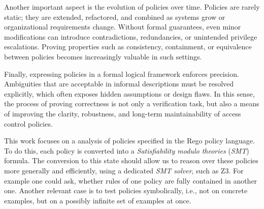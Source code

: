 Another important aspect is the evolution of policies over time.
Policies are rarely static; they are extended, refactored, and combined as systems grow or organizational requirements change.
Without formal guarantees, even minor modifications can introduce contradictions, redundancies, or unintended privilege escalations.
Proving properties such as consistency, containment, or equivalence between policies becomes increasingly valuable in such settings.

Finally, expressing policies in a formal logical framework enforces precision.
Ambiguities that are acceptable in informal descriptions must be resolved explicitly, which often exposes hidden assumptions or design flaws.
In this sense, the process of proving correctness is not only a verification task, but also a means of improving the clarity, robustness, and long-term maintainability of access control policies.

This work focuses on a analysis of policies specified in the Rego policy language.
To do this, each policy is converted into a \emph{Satisfiability modulo theories} (\emph{SMT}) formula.
The conversion to this state should allow us to reason over these policies more generally and efficiently, using a dedicated \emph{SMT solver}, such as Z3.
For example one could ask, whether rules of one policy are fully contained in another one.
Another relevant case is to test policies symbolically, i.e., not on concrete examples, but on a possibly infinite set of examples at once.
